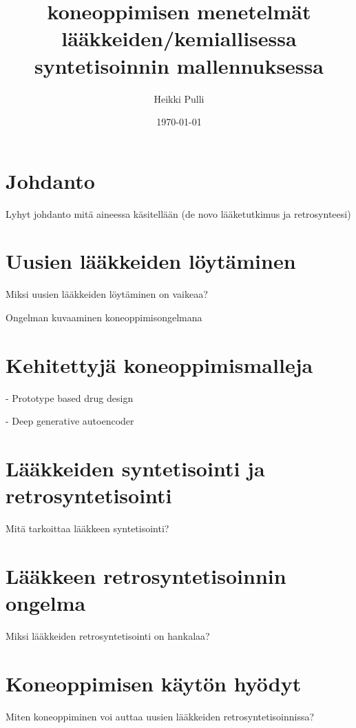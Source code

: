 \documentclass[finnish,twoside,censored,subject,sw-line]{HYthesisML}
\title{koneoppimisen menetelmät lääkkeiden/kemiallisessa syntetisoinnin mallennuksessa}
\author{Heikki Pulli}
\date{\today}
\begin{document}
\maketitle

\newpage
\mytableofcontents
\mainmatter

\chapter{Johdanto}

Lyhyt johdanto mitä aineessa käsitellään (de novo lääketutkimus ja retrosynteesi)

\chapter{Uusien lääkkeiden löytäminen}

Miksi uusien lääkkeiden löytäminen on vaikeaa?~\cite{EkinsSean2019Emlf}

Ongelman kuvaaminen koneoppimisongelmana~\cite{10.1145/3219819.3219882,KadurinArtur2017dAAG}

\chapter{Kehitettyjä koneoppimismalleja}
- Prototype based drug design~\cite{10.1145/3219819.3219882}

- Deep generative autoencoder~\cite{KadurinArtur2017dAAG}

\chapter{Lääkkeiden syntetisointi ja retrosyntetisointi}

Mitä tarkoittaa lääkkeen syntetisointi?~\cite{deAlmeidaA.Filipa2019Socd}

\chapter{Lääkkeen retrosyntetisoinnin ongelma}

Miksi lääkkeiden retrosyntetisointi on hankalaa?~\cite{ButlerKeithT2018Mlfm,deAlmeidaA.Filipa2019Socd}

\chapter{Koneoppimisen käytön hyödyt}

Miten koneoppiminen voi auttaa uusien lääkkeiden retrosyntetisoinnissa?~\cite{VamathevanJessica2019Aoml}
\end{document}
